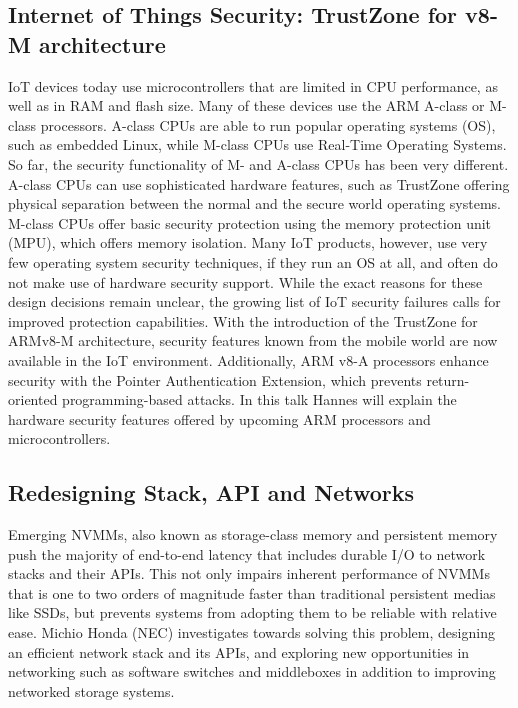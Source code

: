 \subsection{Internet of Things Security: TrustZone for v8-M architecture}

\ac{IoT} devices today use microcontrollers that are limited in CPU
performance, as well as in RAM and flash size. Many of these devices use the
ARM A-class or M-class processors. A-class CPUs are able to run popular
operating systems (OS), such as embedded Linux, while M-class CPUs use
Real-Time Operating Systems. So far, the security functionality of M- and
A-class CPUs has been very different.  A-class CPUs can use sophisticated
hardware features, such as TrustZone offering physical separation between the
normal and the secure world operating systems. M-class CPUs offer basic
security protection using the memory protection unit (MPU), which offers
memory isolation.  Many IoT products, however, use very few operating system
security techniques, if they run an OS at all, and often do not make use of
hardware security support. While the exact reasons for these design decisions
remain unclear, the growing list of IoT security failures calls for improved
protection capabilities.  With the introduction of the TrustZone for ARMv8-M
architecture, security features known from the mobile world are now available
in the \ac{IoT} environment. Additionally, ARM v8-A processors  enhance
security with the Pointer Authentication Extension, which prevents
return-oriented programming-based attacks.  In this talk Hannes will explain
the hardware security features offered by upcoming ARM processors and
microcontrollers.

\subsection{Redesigning Stack, API and Networks} \label{mhonda}

Emerging \ac{NVMMs}, also known as storage-class memory and persistent memory
push the majority of end-to-end latency that includes durable I/O to network
stacks and their APIs.  This not only impairs inherent performance of
\ac{NVMMs} that is one to two orders of magnitude faster than traditional
persistent medias like \ac{SSDs}, but prevents systems from adopting them to
be reliable with relative ease. Michio Honda (NEC) investigates towards
solving this problem, designing an efficient network stack and its APIs, and
exploring new opportunities in networking such as software switches and
middleboxes in addition to improving networked storage systems.
